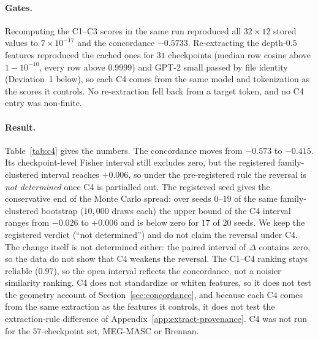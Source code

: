 \documentclass{article}
\begin{document}
\paragraph{Gates.} Recomputing the C1--C3 scores in the same run reproduced all $32\times12$ stored
values to $7\times10^{-17}$ and the concordance $-0.5733$. Re-extracting the depth-$0.5$ features
reproduced the cached ones for $31$ checkpoints (median row cosine above $1-10^{-10}$, every row
above $0.9999$) and GPT-2 small passed by file identity (Deviation~1 below), so each C4 comes from
the same model and tokenization as the scores it controls. No re-extraction fell back from a
target token, and no C4 entry was non-finite.

\paragraph{Result.} Table~\ref{tab:c4} gives the numbers. The concordance moves from $-0.573$ to
$-0.415$. Its checkpoint-level Fisher interval still excludes zero, but the registered
family-clustered interval reaches $+0.006$, so under the pre-registered rule the reversal is
\emph{not determined} once C4 is partialled out. The registered seed gives the conservative end of the
Monte Carlo spread: over seeds $0$--$19$ of the same family-clustered bootstrap ($10{,}000$ draws each)
the upper bound of the C4 interval ranges from $-0.026$ to $+0.006$ and is below zero for $17$ of $20$
seeds. We keep the registered verdict (``not determined'') and do not claim the reversal under C4. The change itself is not determined either: the
paired interval of $\Delta$ contains zero, so the data do not show that C4 weakens the reversal.
The C1--C4 ranking stays reliable ($0.97$), so the open interval reflects the concordance, not a
noisier similarity ranking. C4 does not standardize or whiten features, so it does not test the
geometry account of Section~\ref{sec:concordance}, and because each C4 comes from the same
extraction as the features it controls, it does not test the extraction-rule difference of
Appendix~\ref{app:extract-provenance}. C4 was not run for the $57$-checkpoint set, MEG-MASC or
Brennan.
\end{document}
